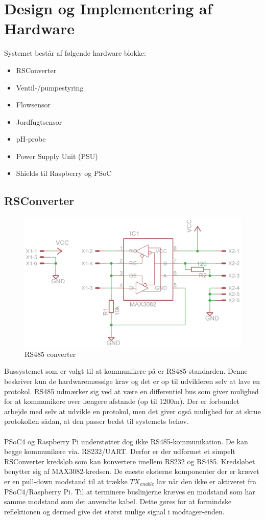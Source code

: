 \section{Design og Implementering af Hardware}
Systemet består af følgende hardware blokke:
\begin{itemize}
\item RSConverter
\item Ventil-/pumpestyring
\item Flowsensor
\item Jordfugtsensor
\item pH-probe
\item Power Supply Unit (PSU)
\item Shields til Raspberry og PSoC
\end{itemize}

\subsection{RSConverter}
\begin{figure}[H]
	\centering
	\includegraphics[scale=1]{../Hardware/RS485_Converter/Schematic}
	\caption{RS485 converter}
	\label{photo:RS485converter}
\end{figure}

Bussystemet som er valgt til at kommunikere på er RS485-standarden. Denne beskriver kun de hardwaremæssige krav og det er op til udvikleren selv at lave en protokol. RS485 udmærker sig ved at være en differentiel bus som giver mulighed for at kommunikere over længere afstande (op til 1200m). Der er forbundet arbejde med selv at udvikle en protokol, men det giver også mulighed for at skrue protokollen sådan, at den passer bedst til systemets behov.
\\\\
PSoC4 og Raspberry Pi understøtter dog ikke RS485-kommunikation. De kan begge kommunikere via. RS232/UART. Derfor er der udformet et simpelt RSConverter kredsløb som kan konvertere imellem RS232 og RS485. Kredsløbet benytter sig af MAX3082-kredsen. De eneste eksterne komponenter der er krævet er en pull-down modstand til at trække $TX_{enable}$ lav når den ikke er aktiveret fra PSoC4/Raspberry Pi. Til at terminere buslinjerne kræves en modstand som har samme modstand som det anvendte kabel. Dette gøres for at formindske reflektionen og dermed give det størst mulige signal i modtager-enden.

